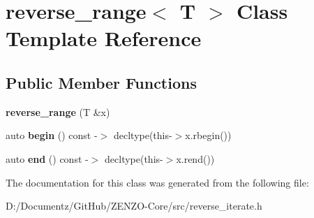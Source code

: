 \hypertarget{classreverse__range}{}\section{reverse\+\_\+range$<$ T $>$ Class Template Reference}
\label{classreverse__range}
\subsection*{Public Member Functions}
\begin{DoxyCompactItemize}
\item 
\mbox{\label{classreverse__range_a5db504f7033079a90c464efc7ff96fb3}} 
{\bfseries reverse\+\_\+range} (T \&x)
\item 
\mbox{\label{classreverse__range_aadf265e643103b6cab3ad9ecdebb9571}} 
auto {\bfseries begin} () const -\/$>$ decltype(this-\/$>$x.\+rbegin())
\item 
\mbox{\label{classreverse__range_acd95521213e8796a78c4ef11c81df686}} 
auto {\bfseries end} () const -\/$>$ decltype(this-\/$>$x.\+rend())
\end{DoxyCompactItemize}


The documentation for this class was generated from the following file\+:\begin{DoxyCompactItemize}
\item 
D\+:/\+Documentz/\+Git\+Hub/\+Z\+E\+N\+Z\+O-\/\+Core/src/reverse\+\_\+iterate.\+h\end{DoxyCompactItemize}

